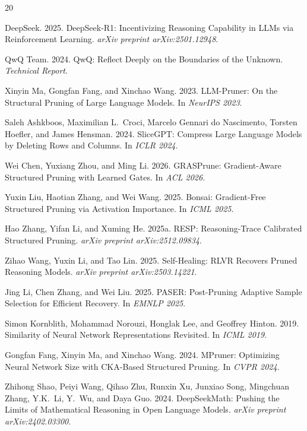 \documentclass[11pt,a4paper]{article}
\begin{document}
\begin{thebibliography}{20}

DeepSeek. 2025.
DeepSeek-R1: Incentivizing Reasoning Capability in LLMs via Reinforcement Learning.
\textit{arXiv preprint arXiv:2501.12948}.

QwQ Team. 2024.
QwQ: Reflect Deeply on the Boundaries of the Unknown.
\textit{Technical Report}.

Xinyin Ma, Gongfan Fang, and Xinchao Wang. 2023.
LLM-Pruner: On the Structural Pruning of Large Language Models.
In \textit{NeurIPS 2023}.

Saleh Ashkboos, Maximilian L.\ Croci, Marcelo Gennari do Nascimento, Torsten Hoefler, and James Hensman. 2024.
SliceGPT: Compress Large Language Models by Deleting Rows and Columns.
In \textit{ICLR 2024}.

Wei Chen, Yuxiang Zhou, and Ming Li. 2026.
GRASPrune: Gradient-Aware Structured Pruning with Learned Gates.
In \textit{ACL 2026}.

Yuxin Liu, Haotian Zhang, and Wei Wang. 2025.
Bonsai: Gradient-Free Structured Pruning via Activation Importance.
In \textit{ICML 2025}.

Hao Zhang, Yifan Li, and Xuming He. 2025a.
RESP: Reasoning-Trace Calibrated Structured Pruning.
\textit{arXiv preprint arXiv:2512.09834}.

Zihao Wang, Yuxin Li, and Tao Lin. 2025.
Self-Healing: RLVR Recovers Pruned Reasoning Models.
\textit{arXiv preprint arXiv:2503.14221}.

Jing Li, Chen Zhang, and Wei Liu. 2025.
PASER: Post-Pruning Adaptive Sample Selection for Efficient Recovery.
In \textit{EMNLP 2025}.

Simon Kornblith, Mohammad Norouzi, Honglak Lee, and Geoffrey Hinton. 2019.
Similarity of Neural Network Representations Revisited.
In \textit{ICML 2019}.

Gongfan Fang, Xinyin Ma, and Xinchao Wang. 2024.
MPruner: Optimizing Neural Network Size with CKA-Based Structured Pruning.
In \textit{CVPR 2024}.

Zhihong Shao, Peiyi Wang, Qihao Zhu, Runxin Xu, Junxiao Song, Mingchuan Zhang, Y.K.\ Li, Y.\ Wu, and Daya Guo. 2024.
DeepSeekMath: Pushing the Limits of Mathematical Reasoning in Open Language Models.
\textit{arXiv preprint arXiv:2402.03300}.

\end{thebibliography}
\end{document}
